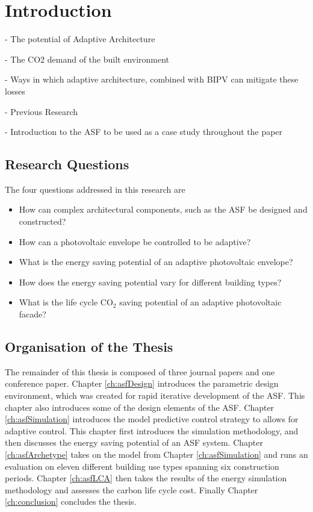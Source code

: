 
\chapter{Introduction}
\label{ch:introduction}



- The potential of Adaptive Architecture

- The CO2 demand of the built environment

- Ways in which adaptive architecture, combined with BIPV can mitigate these losses

- Previous Research 

- Introduction to the ASF to be used as a case study throughout the paper


\section{Research Questions}

The four questions addressed in this research are 

\begin{itemize}
\item How can complex architectural components, such as the ASF be designed and constructed? 
\item How can a photovoltaic envelope be controlled to be adaptive?
\item What is the energy saving potential of an adaptive photovoltaic envelope?
\item How does the energy saving potential vary for different building types?
\item What is the life cycle CO$_2$ saving potential of an adaptive photovoltaic facade?

\end{itemize}

\section{Organisation of the Thesis}

The remainder of this thesis is composed of three journal papers and one conference paper. Chapter \ref{ch:asfDesign} introduces the parametric design environment, which was created for rapid iterative development of the ASF. This chapter also introduces some of the design elements of the ASF. Chapter \ref{ch:asfSimulation} introduces the model predictive control strategy to allows for adaptive control. This chapter first introduces the simulation methodology, and then discusses the energy saving potential of an ASF system. Chapter \ref{ch:asfArchetype} takes on the model from Chapter \ref{ch:asfSimulation} and runs an evaluation on eleven different building use types spanning six construction periods. Chapter \ref{ch:asfLCA} then takes the results of the energy simulation methodology and assesses the carbon life cycle cost. Finally Chapter \ref{ch:conclusion} concludes the thesis. 